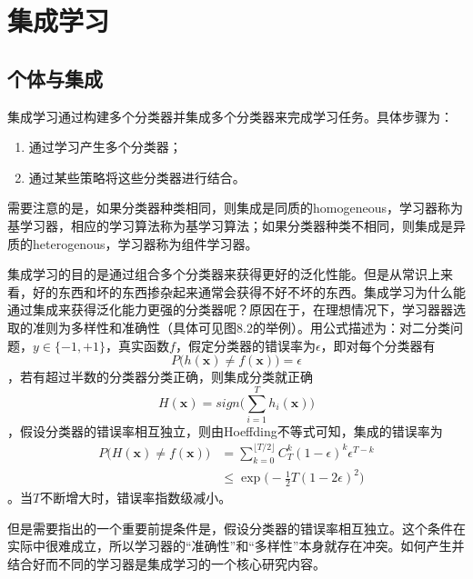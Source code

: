 \chapter{集成学习}

\section{个体与集成}

集成学习通过构建多个分类器并集成多个分类器来完成学习任务。具体步骤为：
\begin{enumerate}
\item 通过学习产生多个分类器；
\item 通过某些策略将这些分类器进行结合。
\end{enumerate}
需要注意的是，如果分类器种类相同，则集成是同质的homogeneous，学习器称为基学习器，相应的学习算法称为基学习算法；如果分类器种类不相同，则集成是异质的heterogenous，学习器称为组件学习器。

集成学习的目的是通过组合多个分类器来获得更好的泛化性能。但是从常识上来看，好的东西和坏的东西掺杂起来通常会获得不好不坏的东西。集成学习为什么能通过集成来获得泛化能力更强的分类器呢？原因在于，在理想情况下，学习器器选取的准则为多样性和准确性（具体可见图8.2的举例）。用公式描述为：对二分类问题，$y\in \{-1,+1\}$，真实函数$f$，假定分类器的错误率为$\epsilon$，即对每个分类器有
\begin{equation}
P\big(h(\mathbf{x})\neq f(\mathbf{x})\big)=\epsilon
\end{equation}，若有超过半数的分类器分类正确，则集成分类就正确
\begin{equation}
H(\mathbf{x})=sign\Big(\sum_{i=1}^Th_i(\mathbf{x})\Big)
\end{equation}
，假设分类器的错误率相互独立，则由Hoeffding不等式可知，集成的错误率为
\begin{equation}\begin{split}
P\Big(H(\mathbf{x})\neq f(\mathbf{x})\Big)&=\sum_{k=0}^{\lfloor T/2 \rfloor}C_T^k(1-\epsilon)^k\epsilon^{T-k}\\
&\le \exp\Big(-\frac{1}{2}T(1-2\epsilon)^2\Big)
\end{split}\end{equation}
。当$T$不断增大时，错误率指数级减小。

但是需要指出的一个重要前提条件是，假设分类器的错误率相互独立。这个条件在实际中很难成立，所以学习器的“准确性”和“多样性”本身就存在冲突。如何产生并结合好而不同的学习器是集成学习的一个核心研究内容。

